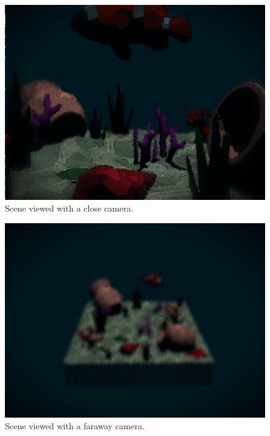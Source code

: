 \documentclass{article}
\begin{document}
\begin{figure}[h]
	\centering
	\includegraphics[width=\linewidth]{imgs/results_close.png}
	\caption{Scene viewed with a close camera.}
	\label{fig:results_close}
\end{figure}

\begin{figure}[h]
	\centering
	\includegraphics[width=\linewidth]{imgs/results_far.png}
	\caption{Scene viewed with a faraway camera.}
	\label{fig:results_far}
\end{figure}
\end{document}
